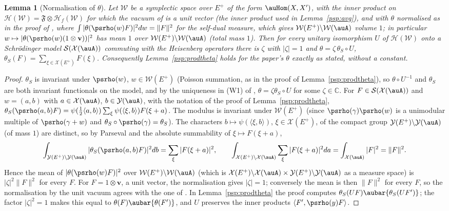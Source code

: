 \documentclass[10pt]{amsart}
\newtheorem{lemma}[theorem]{Lemma}
\theoremstyle{definition}
\theoremstyle{remark}
\newcommand{\C}{\mathbb C}
\providecommand{\psHS}{\mathcal H}
\providecommand{\psvac}{\mathbf v}
\begin{document}
\begin{lemma}[Normalisation of $\theta$]\label{psq:thetanorm}
Let $\mathcal W$ be a symplectic space over $E^+$ of the form $\auHom(X,X')$, with the inner product on
$\psHS(\mathcal W)=\mathfrak F\otimes\psHS_f(\mathcal W)$ for which the vacuum of {\cite[\S5.2.1]{P49}}
is a unit vector \textup(the inner product used in Lemma~\ref{psp:avg}\textup), and with $\theta$
normalised as in the proof of {\cite[Proposition~5.27(ii)]{P49}}, where $\int|\theta(\psrho(w)F)|^2dw=\|F\|^2$ for the self-dual measure, which gives $\mathcal W(E^+)\backslash\mathcal W(\auA)$ volume $1$; in particular $w\mapsto|\theta(\psrho(w)(1\otimes\psvac))|^2$ has mean $1$ over
$\mathcal W(E^+)\backslash\mathcal W(\auA)$ \textup(total mass $1$\textup). Then for every unitary
isomorphism $U$ of $\psHS(\mathcal W)$ onto a Schr\"odinger model $\mathcal S(\mathcal X(\auA))$
commuting with the Heisenberg operators there is $\zeta$ with $|\zeta|=1$ and $\theta=\zeta\,\theta_S\circ U$,
$\theta_S(F)=\sum_{\xi\in\mathcal X(E^+)}F(\xi)$. Consequently Lemma~\ref{psp:prodtheta} holds for the
paper's $\theta$ exactly as stated, without a constant.
\end{lemma}
\begin{proof}
$\theta_S$ is invariant under $\psrho(w)$, $w\in\mathcal W(E^+)$ (Poisson summation, as in the proof of
Lemma~\ref{psp:prodtheta}), so $\theta\circ U^{-1}$ and $\theta_S$ are both invariant functionals on the
model, and by the uniqueness in (W1) of {\cite[Lemma~5.2]{P49}}, $\theta=\zeta\theta_S\circ U$ for some
$\zeta\in\C$. For $F\in\mathcal S(\mathcal X(\auA))$ and $w=(a,b)$ with $a\in\mathcal X(\auA)$,
$b\in\mathcal Y(\auA)$, with the notation of the proof of Lemma~\ref{psp:prodtheta},
$\theta_S(\psrho(a,b)F)=\psi(\frac12\langle a,b\rangle)\sum_\xi\psi(\langle\xi,b\rangle)F(\xi+a)$. The
modulus is invariant under $\mathcal W(E^+)$ (since $\psrho(\gamma)\psrho(w)$ is a unimodular multiple
of $\psrho(\gamma+w)$ and $\theta_S\circ\psrho(\gamma)=\theta_S$). The characters $b\mapsto\psi(\langle\xi,b
\rangle)$, $\xi\in\mathcal X(E^+)$, of the compact group $\mathcal Y(E^+)\backslash\mathcal Y(\auA)$ (of mass
$1$) are distinct, so by Parseval and the absolute summability of $\xi\mapsto F(\xi+a)$,
\[
\int_{\mathcal Y(E^+)\backslash\mathcal Y(\auA)}|\theta_S(\psrho(a,b)F)|^2db=\sum_\xi|F(\xi+a)|^2,\qquad
\int_{\mathcal X(E^+)\backslash\mathcal X(\auA)}\sum_\xi|F(\xi+a)|^2da=\int_{\mathcal X(\auA)}|F|^2=\|F\|^2 .
\]
Hence the mean of $|\theta(\psrho(w)F)|^2$ over $\mathcal W(E^+)\backslash\mathcal W(\auA)$ (which is
$\mathcal X(E^+)\backslash\mathcal X(\auA)\times\mathcal Y(E^+)\backslash\mathcal Y(\auA)$ as a measure space) is
$|\zeta|^2\|F\|^2$ for every $F$. For $F=1\otimes\psvac$, a unit vector, the normalisation gives
$|\zeta|=1$; conversely the mean is then $\|F\|^2$ for every $F$, so the normalisation by the unit vacuum agrees with the one of {\cite[Proposition~5.27(ii)]{P49}}. In Lemma~\ref{psp:prodtheta} the proof computes $\theta_S(UF)\aubar{\theta_S(UF')}$; the
factor $|\zeta|^2=1$ makes this equal to $\theta(F)\aubar{\theta(F')}$, and $U$ preserves the inner
products $\langle F',\psrho(y)F\rangle$.
\end{proof}
\end{document}
